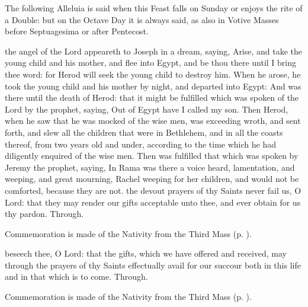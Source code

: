 \begin{rubric}
    The following Alleluia is said when this Feast falls on Sunday or enjoys the rite of a  Double: but on the Octave Day it is always said, as also in Votive Masses before Septuagesima or after Pentecost.
\end{rubric}
 the angel of the Lord appeareth to Joseph in a dream, saying, Arise, and take the young child and his mother, and flee into Egypt, and be thou there until I bring thee word: for Herod will seek the young child to destroy him. When he arose, he took the young child and his mother by night, and departed into Egypt: And was there until the death of Herod: that it might be fulfilled which was spoken of the Lord by the prophet, saying, Out of Egypt have I called my son. Then Herod, when he saw that he was mocked of the wise men, was exceeding wroth, and sent forth, and slew all the children that were in Bethlehem, and in all the coasts thereof, from two years old and under, according to the time which he had diligently enquired of the wise men. Then was fulfilled that which was spoken by Jeremy the prophet, saying, In Rama was there a voice heard, lamentation, and weeping, and great mourning, Rachel weeping for her children, and would not be comforted, because they are not.
\secret
{} the devout prayers of thy Saints never fail us, O Lord: that they may render our gifts acceptable unto thee, and ever obtain for us thy pardon. Through.
\begin{rubric}
    Commemoration is made of the Nativity from the Third Mass (p. \pageref{NativityMassIII}).
\end{rubric}
\postcommunion
{} beseech thee, O Lord: that the gifts, which we have offered and received, may through the prayers of thy Saints effectually avail for our succour both in this life and in that which is to come. Through.
\begin{rubric}
    Commemoration is made of the Nativity from the Third Mass (p. \pageref{NativityMassIII}).
\end{rubric}

